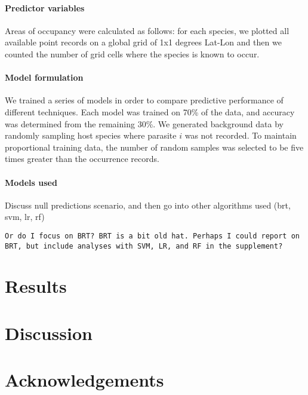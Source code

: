 \documentclass[12pt]{article}
\begin{document}
 
 \paragraph{Predictor variables}
 Areas of occupancy were calculated as follows: for each species, we plotted all available point records on a global grid of 1x1 degrees  Lat-Lon and then we counted the number of grid cells where the species is known to occur.
 
 
 \paragraph{Model formulation}
 We trained a series of models in order to compare predictive performance of different techniques. Each model was trained on 70\% of the data, and accuracy was determined from the remaining 30\%. We generated background data by randomly sampling host species where parasite $i$ was not recorded. To maintain proportional training data, the number of random samples was selected to be five times greater than the occurrence records. 
  
  
 \paragraph{Models used}
 Discuss null predictions scenario, and then go into other algorithms used (brt, svm, lr, rf)

\texttt{Or do I focus on BRT? BRT is a bit old hat. Perhaps I could report on BRT, but include analyses with SVM, LR, and RF in the supplement?}



 
 
  
\section{Results}



  
  
  


\section{Discussion}
 
 
 
 
 
 
 
\section{Acknowledgements}
\end{document}
